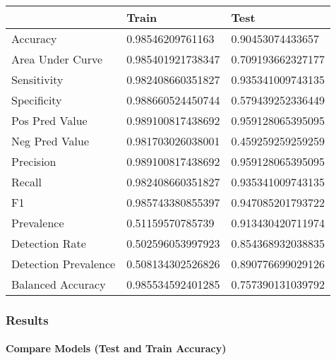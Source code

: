 \documentclass[
]{article}
\begin{document}
\begin{table}[H]
\centering
\begin{tabular}{l|l|l}
\hline
  & Train & Test\\
\hline
Accuracy & 0.98546209761163 & 0.90453074433657\\
\hline
Area Under Curve & 0.985401921738347 & 0.709193662327177\\
\hline
Sensitivity & 0.982408660351827 & 0.935341009743135\\
\hline
Specificity & 0.988660524450744 & 0.579439252336449\\
\hline
Pos Pred Value & 0.989100817438692 & 0.959128065395095\\
\hline
Neg Pred Value & 0.981703026038001 & 0.459259259259259\\
\hline
Precision & 0.989100817438692 & 0.959128065395095\\
\hline
Recall & 0.982408660351827 & 0.935341009743135\\
\hline
F1 & 0.985743380855397 & 0.947085201793722\\
\hline
Prevalence & 0.51159570785739 & 0.913430420711974\\
\hline
Detection Rate & 0.502596053997923 & 0.854368932038835\\
\hline
Detection Prevalence & 0.508134302526826 & 0.890776699029126\\
\hline
Balanced Accuracy & 0.985534592401285 & 0.757390131039792\\
\hline
\end{tabular}
\end{table}

\hypertarget{results}{%
\subsubsection{Results}\label{results}}

\hypertarget{compare-models-test-and-train-accuracy}{%
\paragraph{Compare Models (Test and Train
Accuracy)}\label{compare-models-test-and-train-accuracy}}
\end{document}
